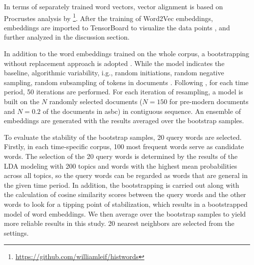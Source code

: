 In terms of separately trained word vectors, vector alignment is based on Procrustes analysis by \textcite{hamilton2016law}\footnote{\url{https://github.com/williamleif/histwords}}. After the training of Word2Vec embeddings, embeddings are imported to TensorBoard to visualize the data points \parencite{smilkov2016projector}, and further analyzed in the discussion section.

In addition to the word embeddings trained on the whole corpus, a bootstrapping without replacement approach is adopted \parencite{antoniak2018evaluating}. While the  model indicates the baseline, algorithmic variability, i.g., random initiations, random negative sampling, random subsampling of tokens in documents \parencite{antoniak2018evaluating}. Following \textcite{antoniak2018evaluating}, for each time period, 50 iterations are performed. For each iteration of resampling, a model is built on the $N$ randomly selected documents ($N=150$ for pre-modern documents and $N=0.2$ of the documents in \gls{asbc}) in contiguous sequence. An ensemble of embeddings are generated with the results averaged over the bootstrap samples.

To evaluate the stability of the bootstrap samples, 20 query words are selected. Firstly, in each time-specific corpus, 100 most frequent words serve as candidate words. The selection of the 20 query words is determined by the results of the LDA modeling with 200 topics and words with the highest mean probabilities across all topics, so the query words can be regarded as words that are general in the given time period. In addition, the bootstrapping is carried out along with the calculation of cosine similarity scores between the query words and the other words to look for a tipping point of stabilization, which results in a bootstrapped model of word embeddings. We then average over the bootstrap samples to yield more reliable results in this study. 20 nearest neighbors are selected from the  settings. 


